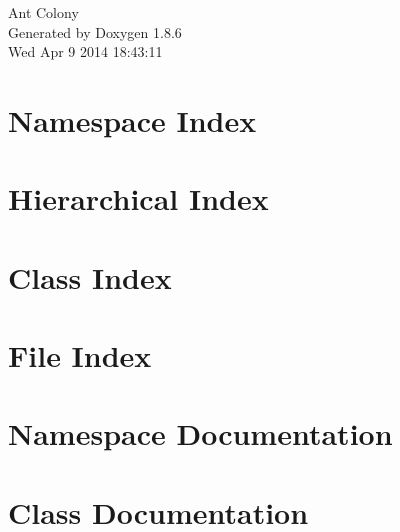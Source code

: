 \documentclass[twoside]{book}
\newcommand{\+}{\discretionary{\mbox{\scriptsize$\hookleftarrow$}}{}{}}
\newcommand{\clearemptydoublepage}{%
  \newpage{\pagestyle{empty}\cleardoublepage}%
}
\begin{document}
\hypersetup{pageanchor=false,
             bookmarks=true,
             bookmarksnumbered=true,
             pdfencoding=unicode
            }
\begin{titlepage}
\vspace*{7cm}
\begin{center}%
{\Large Ant Colony }\\
\vspace*{1cm}
{\large Generated by Doxygen 1.8.6}\\
\vspace*{0.5cm}
{\small Wed Apr 9 2014 18:43:11}\\
\end{center}
\end{titlepage}
\clearemptydoublepage
\tableofcontents
\clearemptydoublepage
{}
\hypersetup{pageanchor=true}

\chapter{Namespace Index}

\chapter{Hierarchical Index}

\chapter{Class Index}

\chapter{File Index}

\chapter{Namespace Documentation}







\chapter{Class Documentation}














\end{document}

